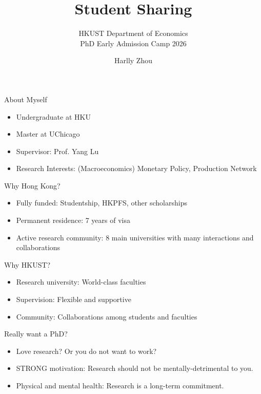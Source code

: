 \documentclass[aspectratio=1610,xcolor=dvipsnames]{beamer}
\title[Student Sharing 2026]{Student Sharing}
\subtitle{HKUST Department of Economics\\
PhD Early Admission Camp 2026}
\author[Harlly Zhou]{Harlly Zhou}
\institute[HKUST]{Department of Economics\\
HKUST Business School}
\date{}
\begin{document}
\begin{frame}
\titlepage
\end{frame}

\begin{frame}{About Myself}
    \begin{itemize}
        \item Undergraduate at HKU
        \item Master at UChicago
        \item Supervisor: Prof. Yang Lu
        \item Research Interests: (Macroeconomics) Monetary Policy, Production Network
    \end{itemize}
\end{frame}

\begin{frame}{Why Hong Kong?}
    \begin{itemize}
        \item Fully funded: Studentship, HKPFS, other scholarships
        \item Permanent residence: 7 years of visa
        \item Active research community: 8 main universities with many interactions and collaborations
    \end{itemize}
\end{frame}

\begin{frame}{Why HKUST?}
    \begin{itemize}
        \item Research university: World-class faculties
        \item Supervision: Flexible and supportive
        \item Community: Collaborations among students and faculties
    \end{itemize}
\end{frame}

\begin{frame}{Really want a PhD?}
    \begin{itemize}
        \item Love research? Or you do not want to work?
        \item STRONG motivation: Research should not be mentally-detrimental to you.
        \item Physical and mental health: Research is a long-term commitment.
    \end{itemize}
\end{frame}
\end{document}
